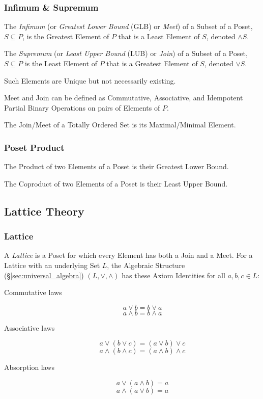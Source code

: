 \subsubsection{Infimum \& Supremum}\label{sec:glb_lub}

The \emph{Infimum} (or \emph{Greatest Lower Bound} (GLB) or
\emph{Meet}) of a Subset of a Poset, $S \subseteq P$, is the Greatest
Element of $P$ that is a Least Element of $S$, denoted $\wedge S$.

The \emph{Supremum} (or \emph{Least Upper Bound} (LUB) or \emph{Join})
of a Subset of a Poset, $S \subseteq P$ is the Least Element of $P$
that is a Greatest Element of $S$, denoted $\vee S$.

Such Elements are Unique but not necessarily existing.

Meet and Join can be defined as Commutative, Associative, and
Idempotent Partial Binary Operations on pairs of Elements of $P$.

The Join/Meet of a Totally Ordered Set is its Maximal/Minimal Element.



\subsubsection{Poset Product}\label{sec:poset_product}

The Product of two Elements of a Poset is their Greatest Lower Bound.

The Coproduct of two Elements of a Poset is their Least Upper Bound.



\subsection{Lattice Theory}\label{sec:lattice_theory}

\subsubsection{Lattice}\label{sec:lattice}

A \emph{Lattice} is a Poset for which every Element has both a Join
and a Meet. For a Lattice with an underlying Set $L$, the Algebraic
Structure (\S\ref{sec:universal_algebra}) $(L, \vee, \wedge)$ has
these Axiom Identities for all $a,b,c \in L$:
\begin{description}
\item[Commutative laws]
\[
    a \vee b = b \vee a
\] \[
    a \wedge b = b \wedge a
\]
\item[Associative laws]
\[
    a \vee (b \vee c) = (a \vee b) \vee c
\] \[
    a \wedge (b \wedge c) = (a \wedge b) \wedge c
\]
\item[Absorption laws]
\[
    a \vee (a \wedge b) = a
\] \[
    a \wedge (a \vee b) = a
\]
\end{description}



